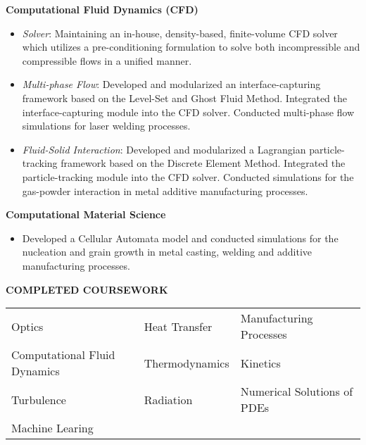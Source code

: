 \documentclass[11pt, letterpaper]{article}
\begin{document}
\fullrule
\vspace{6pt}
\textbf{Computational Fluid Dynamics (CFD)}
\begin{itemize}[leftmargin=*, labelsep=5mm]
   \item \textit{Solver}: Maintaining an in-house, density-based, finite-volume CFD solver which utilizes a pre-conditioning formulation to solve both incompressible and compressible flows in a unified manner. 
   \item \textit{Multi-phase Flow}: Developed and modularized an interface-capturing framework based on the Level-Set and Ghost Fluid Method. Integrated the interface-capturing module into the CFD solver. Conducted multi-phase flow simulations for laser welding processes.
   \item \textit{Fluid-Solid Interaction}: Developed and modularized a Lagrangian particle-tracking framework based on the Discrete Element Method. Integrated the particle-tracking module into the CFD solver. Conducted simulations for the gas-powder interaction in metal additive manufacturing processes.
\end{itemize}

\vspace{3pt}
\textbf{Computational Material Science}
\begin{itemize}[leftmargin=*, labelsep=5mm]
   \item Developed a Cellular Automata model and conducted simulations for the nucleation and grain growth in metal casting, welding and additive manufacturing processes.
\end{itemize}
\vspace{-3pt}
\paraspace
\textbf{COMPLETED COURSEWORK}

\fullrule
\begin{table}[H]
   \centering
   \begin{tabular}{p{6cm}p{4cm}p{5cm}}
      Optics & Heat Transfer & Manufacturing Processes \\
      Computational Fluid Dynamics & Thermodynamics & Kinetics \\
      Turbulence & Radiation & Numerical Solutions of PDEs \\
      Machine Learing & & 
   \end{tabular}
\end{table}
\end{document}

